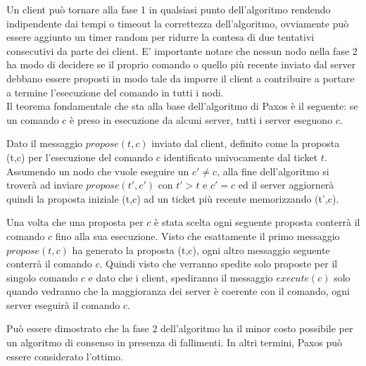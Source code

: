 		
	Un client può tornare alla fase 1 in qualsiasi punto dell'algoritmo rendendo indipendente dai tempi o timeout la correttezza dell'algoritmo, ovviamente può essere aggiunto un timer random per ridurre la contesa di due tentativi consecutivi da parte dei client.
	E' importante notare che nessun nodo nella fase 2 ha modo di decidere se il proprio comando o quello più recente inviato dal server debbano essere proposti in modo tale da imporre il client a contribuire a portare a termine l'esecuzione del comando in tutti i nodi.\\
	
	
	
	Il teorema fondamentale che sta alla base dell'algoritmo di Paxos è il seguente:
	se un comando $c$ è preso in esecuzione da alcuni server, tutti i server eseguono $c$.
	
	Dato il messaggio $propose(t,c)$ inviato dal client, definito come la proposta (t,c) per l'esecuzione del comando $c$ identificato univocamente dal ticket $t$. Assumendo un nodo che vuole eseguire un $c'\not=c$, alla fine dell'algoritmo si troverà ad inviare $propose(t',c')$ con $t'>t$ e $c'=c$ ed il server aggiornerà quindi la proposta iniziale (t,c)  ad un ticket più recente memorizzando (t',c). 
	
	Una volta che una proposta per $c$ è stata scelta ogni seguente proposta conterrà il comando $c$ fino alla sua esecuzione. Visto che esattamente il primo messaggio $propose(t,c)$ ha generato la proposta (t,c), ogni altro messaggio seguente conterrà il comando $c$. Quindi visto che verranno spedite solo proposte per il singolo comando $c$ e dato che i client, spediranno il messaggio $execute(c)$ solo quando vedranno che la maggioranza dei server è coerente con il comando, ogni server eseguirà il comando $c$.
	
	\iffalse
	Basti pensare che se due nodi $u_1$ e $u_2$ appartenenti a due insiemi $S_1$ e $S_2$ tali che esiste almeno un $s$ e $s \in S_1 \cap S_2$ allora si stabilisce la maggioranza di $S_1 U S_2$.\fi

	Può essere dimostrato che la fase 2 dell’algoritmo ha il minor costo possibile per un algoritmo di consenso in presenza di fallimenti. In altri termini, Paxos può essere considerato l’ottimo.\cite{keidar2001cost}	
	

